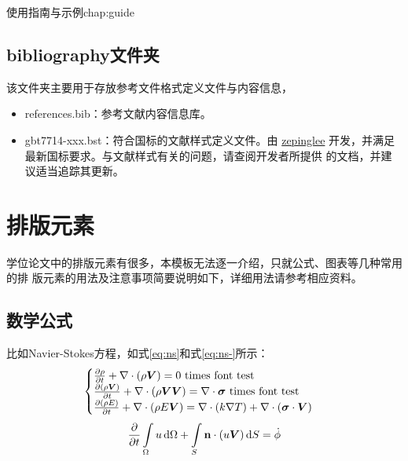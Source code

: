 \begin{cuzchapter}{使用指南与示例}{chap:guide}
    \subsection{bibliography文件夹}\label{sub:bibliography}

    该文件夹主要用于存放参考文件格式定义文件与内容信息，

    \begin{itemize}
        \item references.bib：参考文献内容信息库。
        \item gbt7714-xxx.bst：符合国标的文献样式定义文件。由
              \href{https://github.com/zepinglee/gbt7714-bibtex-style}{zepinglee}
              开发，并满足最新国标要求。与文献样式有关的问题，请查阅开发者所提供
              的文档，并建议适当追踪其更新。
    \end{itemize}

    \section{排版元素}\label{sec:elements}

    学位论文中的排版元素有很多，本模板无法逐一介绍，只就公式、图表等几种常用的排
    版元素的用法及注意事项简要说明如下，详细用法请参考相应资料。

    \subsection{数学公式}\label{sub:equations}

    比如Navier-Stokes方程，如式\eqref{eq:ns}和式\eqref{eq:ns-}所示：
    \begin{equation}
        \label{eq:ns}
        \begin{cases}
            \frac{\partial \rho}{\partial t} + \nabla\cdot(\rho\Vector{V}) = 0 \ \mathrm{times\ font\ test}                                            \\
            \frac{\partial (\rho\Vector{V})}{\partial t} + \nabla\cdot(\rho\Vector{V}\Vector{V}) = \nabla\cdot\Tensor{\sigma} \ \text{times font test} \\
            \frac{\partial (\rho E)}{\partial t} + \nabla\cdot(\rho E\Vector{V}) = \nabla\cdot(k\nabla T) + \nabla\cdot(\Tensor{\sigma}\cdot\Vector{V})
        \end{cases}
    \end{equation}
    \begin{equation}
        \label{eq:ns-}
        \frac{\partial }{\partial t}\int\limits_{\Omega} u \, \mathrm{d}\Omega + \int\limits_{S} \boldsymbol{\mathbf{n}}\cdot(u\boldsymbol{V}) \, \mathrm{d}S = \dot{\phi}
    \end{equation}


\end{cuzchapter}
